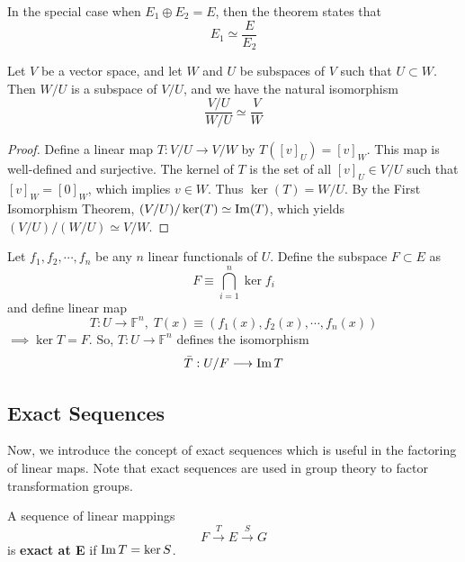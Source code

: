  \begin{corollary}
    In the special case when $E_1 \oplus E_2 = E$, then the theorem states that 
    \begin{equation}
      E_1 \simeq \frac{E}{E_2}
    \end{equation}
  \end{corollary}

  \begin{theorem}
    Let $V$ be a vector space, and let $W$ and $U$ be subspaces of $V$ such that $U \subset W$. Then $W/U$ is a subspace of $V/U$, and we have the natural isomorphism
    \begin{equation}
      \frac{V / U}{W / U} \simeq \frac{V}{W}
    \end{equation}
  \end{theorem}
  \begin{proof}
    Define a linear map $T: V/U \longrightarrow V/W$ by $T([v]_U) = [v]_W$. This map is well-defined and surjective. The kernel of $T$ is the set of all $[v]_U \in V/U$ such that $[v]_W = [0]_W$, which implies $v \in W$. Thus $\ker(T) = W/U$. By the First Isomorphism Theorem, $(V/U) / \ker(T) \simeq \operatorname{Im}(T)$, which yields $(V/U)/(W/U) \simeq V/W$.
  \end{proof}

  Let $f_1, f_2, \cdots, f_n$ be any $n$ linear functionals of $U$. Define the subspace $F \subset E$ as 
  \begin{equation}
    F \equiv \bigcap_{i=1}^n \ker{f_i}
  \end{equation}
  and define linear map 
  \begin{equation}
    T: U \longrightarrow \mathbb{F}^n, \; T(x) \equiv (f_1(x), f_2(x), \cdots, f_n(x))
  \end{equation}
  $\implies \ker{T} = F$. So, $T: U \longrightarrow \mathbb{F}^n$ defines the isomorphism 
  \begin{equation}
    \bar{T}: U / F \longrightarrow \operatorname{Im}{T}
  \end{equation}

\subsection{Exact Sequences}

  Now, we introduce the concept of exact sequences which is useful in the factoring of linear maps. Note that exact sequences are used in group theory to factor transformation groups. 

  \begin{definition}
    A sequence of linear mappings 
    \begin{equation}
      F \xrightarrow{T} E \xrightarrow{S} G
    \end{equation}
    is \textbf{exact at E} if $\operatorname{Im}{T} = \ker{S}$. 
  \end{definition}

